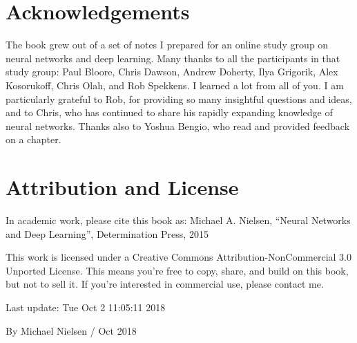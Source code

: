 \section*{Acknowledgements}

The book grew out of a set of notes I prepared for an online study group on neural networks and deep learning. Many thanks to all the participants in that study group: Paul Bloore, Chris Dawson, Andrew Doherty, Ilya Grigorik, Alex Kosorukoff, Chris Olah, and Rob Spekkens. I learned a lot from all of you. I am particularly grateful to Rob, for providing so many insightful questions and ideas, and to Chris, who has continued to share his rapidly expanding knowledge of neural networks. Thanks also to Yoshua Bengio, who read and provided feedback on a chapter.

\section*{Attribution and License}

In academic work, please cite this book \cite{Nielsen2015} as: Michael A. Nielsen, ``Neural Networks and Deep Learning'', Determination Press, 2015 

This work is licensed under a Creative Commons Attribution-NonCommercial 3.0 Unported License. This means you're free to copy, share, and build on this book, but not to sell it. If you're interested in commercial use, please contact me. 

Last update: Tue Oct 2 11:05:11 2018 

By Michael Nielsen / Oct 2018 

